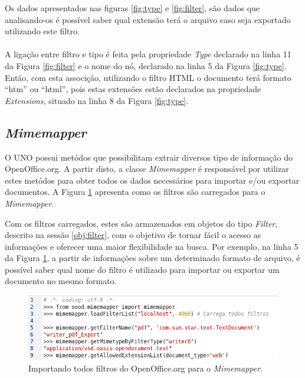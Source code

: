 Os dados apresentados nas figuras \ref{fig:type} e \ref{fig:filter}, são dados que analisando-os é possível saber qual extensão terá o arquivo caso seja exportado utilizando este filtro. 
\paragraph{}

A ligação entre filtro e tipo é feita pela propriedade \textit{Type} declarado na linha 11 da Figura \ref{fig:filter} e o nome do nó, declarado na linha 5 da Figura \ref{fig:type}. Então, com esta associção, utilizando o filtro HTML o documento terá formato ``htm'' ou ``html'', pois estas extensões estão declarados na propriedade \textit{Extensions}, situado na linha 8 da Figura \ref{fig:type}.
\subsection{\textit{Mimemapper}}
\label{obj:mimemapper}

O UNO possui metódos que possibilitam extrair diversos tipo de informação do OpenOffice.org. A partir disto, a classe \textit{Mimemapper} é responsável por utilizar estes metódos para obter todos os dados necessários para importar e/ou exportar documentos. A Figura \ref{fig:load} apresenta como os filtros são carregados para o \textit{Mimemapper}.

Com os filtros carregados, estes são armazenados em objetos do tipo \textit{Filter}, descrito na sessão \ref{obj:filter}, com o objetivo de tornar fácil o acesso as informações e oferecer uma maior flexibilidade na busca. Por exemplo, na linha 5 da Figura \ref{fig:load}, a partir de informações sobre um determinado formato de arquivo, é possível saber qual nome do filtro é utilizado para importar ou exportar um documento no mesmo formato.

\begin{figure}[!ht]
\centering
\begin{center}
\includegraphics[scale=0.74,bb=0 0 580 140]{mime_load.png}
\end{center}
\caption{Importando todos filtros do OpenOffice.org para o \textit{Mimemapper}.}
\label{fig:load}
\end{figure}


